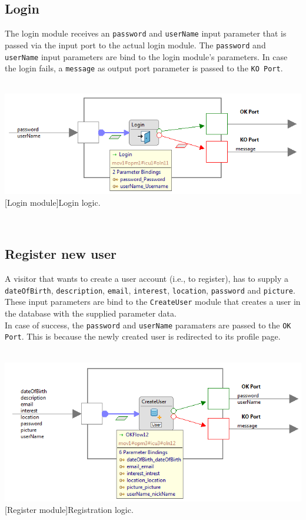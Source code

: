 \documentclass[11pt, a4paper,svglistings,oneside]{book}
\begin{document}
\subsection{Login}

The login module receives an \texttt{password} and \texttt{userName} input parameter that is passed via the input port to the actual login module. The \texttt{password} and \texttt{userName} input parameters are bind to the login module's parameters. In case the login fails, a \texttt{message} as output port parameter is passed to the \texttt{KO Port}.
$\;$ \\ \\
\noindent\begin{minipage}{\textwidth}
    \centering
   \includegraphics[width=\textwidth]{Module_Login.png}
 [Login module]{Login logic.}
\end{minipage}
$\;$ \\ 

\subsection{Register new user}

A visitor that wants to create a user account (i.e., to register), has to supply a \texttt{dateOfBirth}, \texttt{description}, \texttt{email}, \texttt{interest}, \texttt{location}, \texttt{password} and \texttt{picture}. These input parameters are bind to the \texttt{CreateUser} module that creates a user in the database with the supplied parameter data. \\
In case of success, the \texttt{password} and \texttt{userName} paramaters are passed to the \texttt{OK Port}. This is because the newly created user is redirected to its profile page.
$\;$ \\ \\
\noindent\begin{minipage}{\textwidth}
    \centering
   \includegraphics[width=\textwidth]{Module_Register.png}
 [Register module]{Registration logic.}
\end{minipage}
$\;$ \\ 
\end{document}
